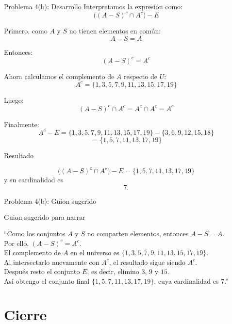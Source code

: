 \documentclass[aspectratio=169,10pt]{beamer}
\newcommand{\Guion}[1]{
	\begin{exampleblock}{Guion sugerido para narrar}
		#1
	\end{exampleblock}
}
\newcommand{\Resultado}[1]{
	\begin{block}{Resultado}
		#1
	\end{block}
}
\begin{document}
	\begin{frame}{Problema 4(b): Desarrollo}
		Interpretamos la expresión como:
		\[
		\big((A-S)^c\cap A^c\big)-E
		\]
		
		Primero, como \(A\) y \(S\) no tienen elementos en común:
		\[
		A-S=A
		\]
		
		Entonces:
		\[
		(A-S)^c=A^c
		\]
		
		Ahora calculamos el complemento de \(A\) respecto de \(U\):
		\[
		A^c=\{1,3,5,7,9,11,13,15,17,19\}
		\]
		
		Luego:
		\[
		(A-S)^c\cap A^c=A^c\cap A^c=A^c
		\]
		
		Finalmente:
		\[
		A^c-E=\{1,3,5,7,9,11,13,15,17,19\}-\{3,6,9,12,15,18\}
		\]
		\[
		=\{1,5,7,11,13,17,19\}
		\]
		
		\Resultado{
			\[
			\big((A-S)^c\cap A^c\big)-E=\{1,5,7,11,13,17,19\}
			\]
			y su cardinalidad es
			\[
			7.
			\]
		}
	\end{frame}
	
	\begin{frame}{Problema 4(b): Guion sugerido}
		\Guion{
			``Como los conjuntos \(A\) y \(S\) no comparten elementos, entonces \(A-S=A\).\\
			Por ello, \((A-S)^c=A^c\).\\
			El complemento de \(A\) en el universo es \(\{1,3,5,7,9,11,13,15,17,19\}\).\\
			Al intersectarlo nuevamente con \(A^c\), el resultado sigue siendo \(A^c\).\\
			Después resto el conjunto \(E\), es decir, elimino \(3\), \(9\) y \(15\).\\
			Así obtengo el conjunto final \(\{1,5,7,11,13,17,19\}\), cuya cardinalidad es \(7\).''}
	\end{frame}
	
	\section{Cierre}
	
\end{document}
